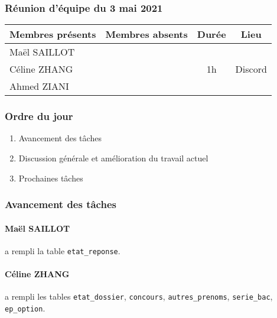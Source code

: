 


% 
\subsubsection*{\large{Réunion d'équipe du 3 mai 2021}}
\begin{center}
\begin{tabular}{| l | l || c | c |}
    \hline
    Membres présents & Membres absents & Durée & Lieu \\
    \hline
    Maël SAILLOT & & & \\ Céline ZHANG & & 1h & Discord \\ Ahmed ZIANI & & & \\
    \hline
\end{tabular}
\end{center}

\subsubsection*{Ordre du jour}
\begin{enumerate}
    \item Avancement des tâches
    \item Discussion générale et amélioration du travail actuel
    \item Prochaines tâches
\end{enumerate}

\subsubsection*{Avancement des tâches}
\paragraph{Maël SAILLOT} a rempli la table \texttt{etat\_reponse}.
\paragraph{Céline ZHANG} a rempli les tables \texttt{etat\_dossier}, \texttt{concours}, \texttt{autres\_prenoms}, \texttt{serie\_bac}, \texttt{ep\_option}.
